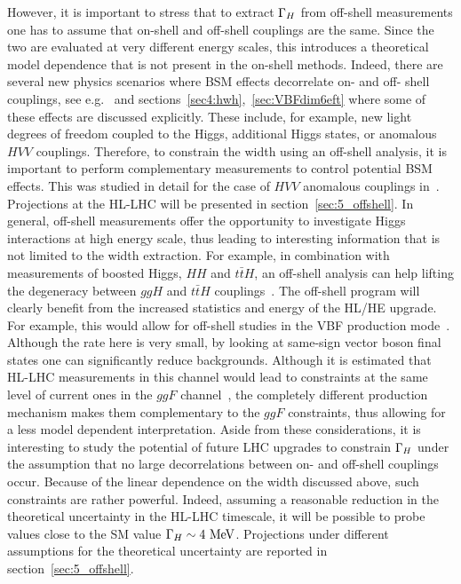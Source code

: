 However, it is important to stress that to extract ${\Gamma_H}$ from off-shell
measurements one has to assume that on-shell and off-shell couplings are the same. Since the two
are evaluated at very different energy scales, this introduces a theoretical model dependence that is not present in the on-shell methods. 
Indeed, there are several new physics scenarios where BSM effects decorrelate on- and off- shell 
couplings, see e.g.~\cite{Azatov:2014jga,Englert:2014aca,Logan:2014ppa,Englert:2014ffa} and sections~\ref{sec4:hwh},~\ref{sec:VBFdim6eft} where some of these effects are discussed explicitly. 
These include, for example, new light degrees of freedom coupled to the Higgs,
additional Higgs states, or anomalous $HVV$ couplings. Therefore, to constrain the width using an off-shell analysis,
 it is important to perform complementary measurements to control potential BSM effects. 
This was studied in detail for the case of $HVV$ anomalous couplings in~\cite{Anderson:2013afp}. 
 Projections at the HL-LHC will be presented in section~\ref{sec:5_offshell}. 
In general, off-shell measurements offer the opportunity to investigate Higgs interactions at 
high energy scale, thus leading to interesting information that is not limited to the width
extraction. For example, in combination with measurements of boosted Higgs, $HH$ and $t\bar tH$, 
an off-shell analysis can help lifting the degeneracy between $ggH$ and $t\bar tH$ 
couplings~\cite{Azatov:2014jga}. The off-shell program will clearly benefit from the 
increased statistics and energy of the HL/HE upgrade. For example, this would allow for 
off-shell studies in the VBF production mode~\cite{Campbell:2015vwa}. 
Although the rate here is very small,
by looking at same-sign vector boson final states one can significantly reduce backgrounds. 
%
Although it is estimated that HL-LHC measurements in this channel would lead to constraints
at the same level of current ones in the $ggF$ channel~\cite{Campbell:2015vwa}, 
the completely different 
production mechanism
makes them complementary to the $ggF$ constraints, thus allowing for a less model dependent
interpretation.
%
Aside from these considerations, it is interesting to study the potential of 
future LHC upgrades to constrain ${\Gamma_H}$ under the assumption that 
no large decorrelations between on- and off-shell couplings occur. Because of the linear dependence on
the width discussed above, such constraints are rather powerful. Indeed, assuming a reasonable
reduction in the theoretical uncertainty in the HL-LHC timescale, 
it will be possible to probe values close to the SM value
${\Gamma_H}\sim 4~{\rm MeV}$. Projections under different assumptions for the theoretical uncertainty
are reported in section~\ref{sec:5_offshell}. 

